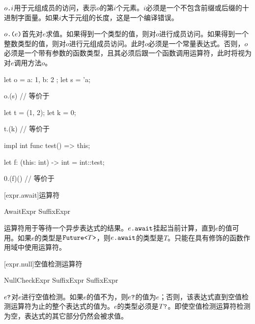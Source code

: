 \pnum
$o\texttt{.}i$用于元组成员的访问，表示$o$的第$i$个元素。$i$必须是一个不包含前缀或后缀的十进制字面量。如果$i$大于元组的长度，这是一个编译错误。

\pnum
$o\texttt{.(}e\texttt{)}$首先对$e$求值。如果得到一个类型的值，则对$o$进行成员访问。如果得到一个整数类型的值，则对$o$进行元组成员访问。此时$o$必须是一个常量表达式。否则，$o$必须是一个带有参数的函数类型，且其必须后跟一个函数调用运算符，此时将视为对$e$调用方法$o$。

\enterexample
\begin{codeblock}
let o = { a: 1, b: 2 };
let s = 'a;

o.(s) // 等价于

let t = (1, 2);
let k = 0;

t.(k) // 等价于

impl int {
    func test() => this;
}

let f: (this: int) -> int = int::test;

0.(f)() // 等价于
\end{codeblock}
\exitexample

[expr.await]{运算符}

\begin{bnf}{AwaitExpr}
    SuffixExpr  
\end{bnf}

\pnum
{}运算符用于等待一个异步表达式的结果。$e\texttt{.await}$挂起当前计算，直到$e$的值可用。如果$e$的类型是$\texttt{Future<}T\texttt{>}$，则$e\texttt{.await}$的类型是$T$。只能在具有修饰的函数作用域中使用运算符。

[expr.null]{空值检测运算符}

\begin{bnf}{NullCheckExpr}
    SuffixExpr  \br
    SuffixExpr \terminal{!}
\end{bnf}

\pnum
$e\texttt{?}$对$e$进行空值检测。如果$e$的值不为，则$e\texttt{?}$的值为$e$；否则，该表达式直到空值检测运算符为止的整个表达式的值为。$e$的类型必须是$T\texttt{?}$。即使空值检测运算符检测为空，表达式的其它部分仍然会被求值。

